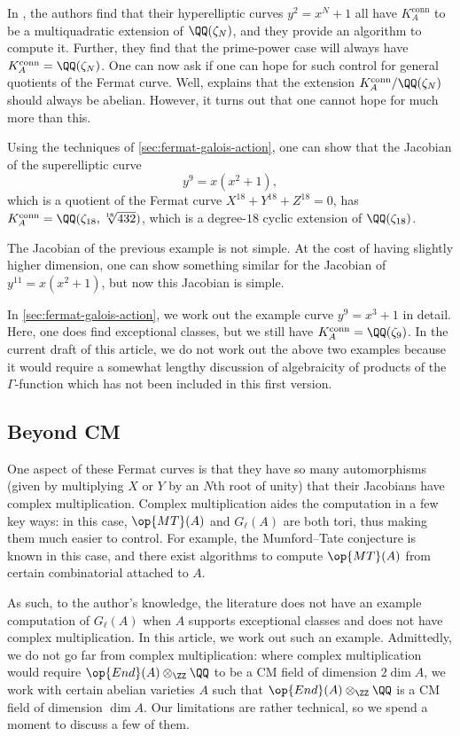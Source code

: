 \documentclass[openany]{book}
\begin{document}
In \cite[Theorem~7.1.1]{ggl-fermat}, the authors find that their hyperelliptic curves $y^2=x^N+1$ all have $K_A^{\mathrm{conn}}$ to be a multiquadratic extension of $\QQ(\zeta_N)$, and they provide an algorithm to compute it. Further, they find that the prime-power case will always have $K_A^{\mathrm{conn}}=\QQ(\zeta_N)$. One can now ask if one can hope for such control for general quotients of the Fermat curve. Well, \cite[Theorem~7.15]{deligne-hodge} explains that the extension $K_A^{\mathrm{conn}}/\QQ(\zeta_N)$ should always be abelian. However, it turns out that one cannot hope for much more than this.
\begin{example}
	Using the techniques of \cref{sec:fermat-galois-action}, one can show that the Jacobian of the superelliptic curve
	\[y^9=x\left(x^2+1\right),\]
	which is a quotient of the Fermat curve $X^{18}+Y^{18}+Z^{18}=0$, has $K_A^{\mathrm{conn}}=\QQ(\zeta_{18},\sqrt[18]{432})$, which is a degree-$18$ cyclic extension of $\QQ(\zeta_{18})$.
\end{example}
\begin{example}
	The Jacobian of the previous example is not simple. At the cost of having slightly higher dimension, one can show something similar for the Jacobian of $y^{11}=x\left(x^2+1\right)$, but now this Jacobian is simple.
\end{example}
In \cref{sec:fermat-galois-action}, we work out the example curve $y^9=x^3+1$ in detail. Here, one does find exceptional classes, but we still have $K_A^{\mathrm{conn}}=\QQ(\zeta_9)$. In the current draft of this article, we do not work out the above two examples because it would require a somewhat lengthy discussion of algebraicity of products of the $\Gamma$-function which has not been included in this first version.

\subsection{Beyond CM}
One aspect of these Fermat curves is that they have so many automorphisms (given by multiplying $X$ or $Y$ by an $N$th root of unity) that their Jacobians have complex multiplication. Complex multiplication aides the computation in a few key ways: in this case, $\op{MT}(A)$ and $G_\ell(A)$ are both tori, thus making them much easier to control. For example, the Mumford--Tate conjecture is known in this case, and there exist algorithms to compute $\op{MT}(A)$ from certain combinatorial attached to $A$.

As such, to the author's knowledge, the literature does not have an example computation of $G_\ell(A)$ when $A$ supports exceptional classes and does not have complex multiplication. In this article, we work out such an example. Admittedly, we do not go far from complex multiplication: where complex multiplication would require $\op{End}(A)\otimes_\ZZ\QQ$ to be a CM field of dimension $2\dim A$, we work with certain abelian varieties $A$ such that $\op{End}(A)\otimes_\ZZ\QQ$ is a CM field of dimension $\dim A$. Our limitations are rather technical, so we spend a moment to discuss a few of them.
\end{document}

